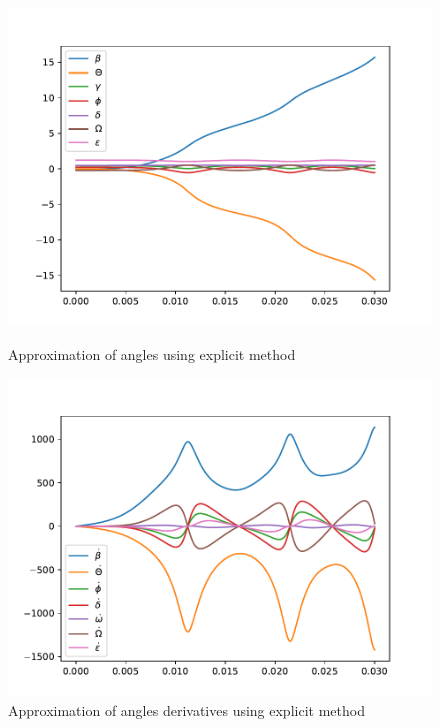 \documentclass{report}
\begin{document}
\begin{figure}[h]
\centering
\begin{minipage}[t]{0.45\textwidth}
\centering
\includegraphics[width=\textwidth]{../Plots/RK4_Proj2/angles}
\caption{Approximation of angles using explicit method}
\label{pl:explicit_angles}
\end{minipage}
\hfill
\begin{minipage}[t]{0.45\textwidth}
\centering
\includegraphics[width=\textwidth]{../Plots/RK4_Proj2/derivatives}
\caption{Approximation of angles derivatives using explicit method}
\label{pl:explicit_angles_dot}
\end{minipage}
\end{figure}
\end{document}
